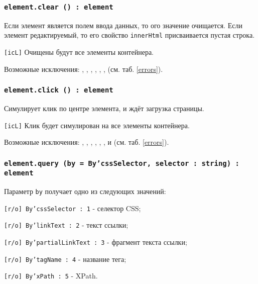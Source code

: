 \subsubsection{\texttt{element.clear () : element}}

Если элемент является полем ввода данных, то ого значение очищается. Если элемент редактируемый, то его свойство \texttt{innerHtml} присваивается пустая строка.

\texttt{[icL]} Очищены будут все элементы контейнера.

Возможные исключения: , , , , , ,  (см. таб. \ref{errors}).

\subsubsection{\texttt{element.click () : element}}

Симулирует клик по центре элемента, и ждёт загрузка страницы.

\texttt{[icL]} Клик будет симулирован на все элементы контейнера.

Возможные исключения: , , , , , ,  и  (см. таб. \ref{errors}).

\subsubsection{\texttt{element.query (by = By'cssSelector, selector : string) : element}}

Параметр \texttt{by} получает одно из следующих значений:
\begin{icItems}
	\item \texttt{[r/o] By'cssSelector : 1} - селектор CSS;
	\item \texttt{[r/o] By'linkText : 2} - текст ссылки;
	\item \texttt{[r/o] By'partialLinkText : 3} - фрагмент текста ссылки;
	\item \texttt{[r/o] By'tagName : 4} - название тега;
	\item \texttt{[r/o] By'xPath : 5} - XPath.
\end{icItems}

